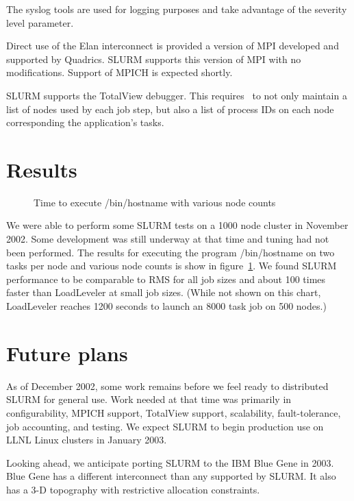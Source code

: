 The syslog tools are used for logging purposes and take advantage of the 
severity level parameter.

Direct use of the Elan interconnect is provided a version of MPI developed 
and supported by Quadrics. SLURM supports this version of MPI with no modifications. 
Support of MPICH is expected shortly.

SLURM supports the TotalView debugger\cite{Etnus2002}. 
This requires \srun\ to not only maintain a list of nodes used by each 
job step, but also a list of process IDs on each node corresponding 
the application's tasks.

\section{Results}

\begin{figure}[htb]
\centerline{}
\caption{Time to execute /bin/hostname with various node counts}
\label{timing}
\end{figure}

We were able to perform some SLURM tests on a 1000 node cluster in November
2002. Some development was still underway at that time and tuning had not been 
performed. The results for executing the program /bin/hostname on two tasks 
per node and various node counts is show in figure~\ref{timing}. 
We found SLURM performance to be comparable to RMS for all job 
sizes and about 100 times faster than LoadLeveler at small job sizes.
(While not shown on this chart, LoadLeveler reaches 1200 seconds to 
launch an 8000 task job on 500 nodes.)

\section{Future plans}

As of December 2002, some work remains before we feel ready to 
distributed SLURM for general use. Work needed at that time was 
primarily in configurability, MPICH support, TotalView support, 
scalability, fault-tolerance, job accounting, and testing. 
We expect SLURM to begin production use on LLNL Linux clusters 
in January 2003.

Looking ahead, we anticipate porting SLURM to the  
IBM Blue Gene\cite{BlueGene2002}
in 2003. 
Blue Gene has a different interconnect than any supported 
by SLURM. 
It also has a 3-D topography with restrictive allocation constraints.

